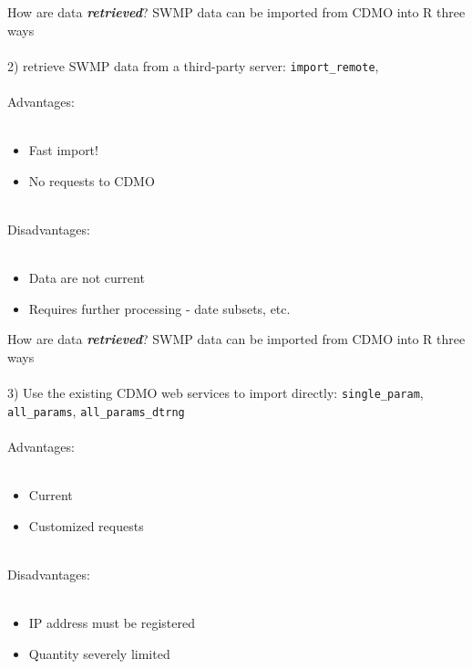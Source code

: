 \documentclass[serif]{beamer}\usepackage[]{graphicx}\usepackage[]{color}
\newcommand{\Bigtxt}[1]{\textbf{\textit{#1}}}
\begin{document}
\begin{frame}[t]{How are data \Bigtxt{retrieved}?}
SWMP data can be imported from CDMO into R three ways\\~\\
2) retrieve SWMP data from a third-party server: \texttt{import\_remote}, \\~\\
Advantages:\\~\\
\begin{itemize}
\item Fast import!
\item No requests to CDMO\\~\\
\end{itemize}
Disadvantages:\\~\\
\begin{itemize}
\item Data are not current
\item Requires further processing - date subsets, etc.
\end{itemize}
\end{frame}

\begin{frame}[t]{How are data \Bigtxt{retrieved}?}
SWMP data can be imported from CDMO into R three ways\\~\\
3) Use the existing CDMO web services to import directly:  \texttt{single\_param}, \texttt{all\_params}, \texttt{all\_params\_dtrng} \\~\\
Advantages: \\~\\
\begin{itemize}
\item Current
\item Customized requests\\~\\
\end{itemize}
Disadvantages:\\~\\
\begin{itemize}
\item IP address must be registered
\item Quantity severely limited
\end{itemize}
\end{frame}
\end{document}
